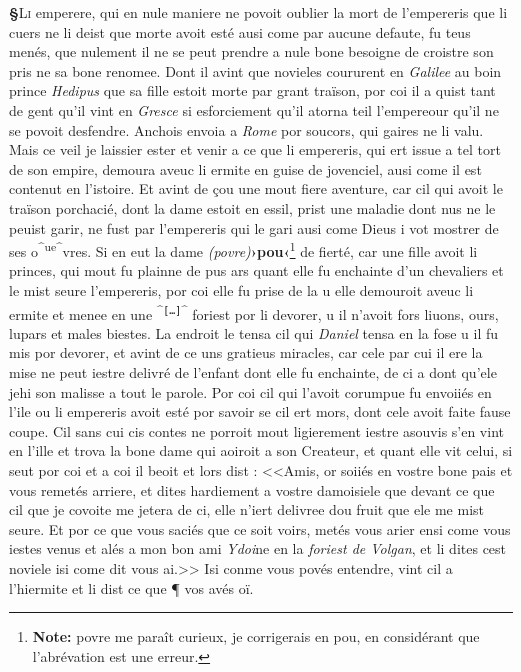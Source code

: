 \documentclass[12pt]{article} %
\newcommand{\colmar}[1]{\marginnote{[#1]}}          %
\newcommand{\persName}[1]{\emph{#1}} %
\newcommand{\placeName}[1]{\emph{#1}} %
\newcommand{\corr}[2]{\emph{(#1)}\textbf{›#2‹}} %
\newcommand{\add}[1]{\textsuperscript{#1}}       %
\newcommand{\supplied}[1]{\textlangle#1\textrangle} %
\newcommand{\missing}{\texttt{[\ldots]}}     %
\newcommand{\fnnote}[1]{\footnote{\textbf{Note:} #1}} %
\newcounter{paranum}
\newcommand{\pnum}{\stepcounter{paranum}\textbf{§\arabic{paranum}}\quad}
\begin{document}
\pnum \lettrine[lines=3]{\color{darkblue}L}{i} emperere, qui en nule maniere ne povoit oublier la mort de l'empereris que li cuers ne li deist que morte avoit esté ausi come par aucune defaute, fu teus menés, que nulement il ne se peut prendre a nule bone besoigne de croistre son pris ne sa bone renomee. Dont il avint que novieles coururent en \placeName{Galilee} au boin prince \persName{Hedipus} que sa fille estoit morte par grant traïson, por coi il a quist tant de gent qu'il vint en \placeName{Gresce} si esforciement qu'il atorna teil l'empereour qu'il ne se povoit desfendre. Anchois envoia a \placeName{Rome} por soucors, qui gaires ne li valu. Mais ce veil je laissier ester et venir a ce que li empereris, qui ert issue a tel tort de son empire, demoura aveuc li ermite en guise de jovenciel, ausi come il est contenut en l'istoire. Et av\supplied{i}nt de çou une mout fiere aventure, car cil qui avoit le traïson porchacié, dont la dame estoit en essil, prist une maladie dont nus ne le peuist garir, ne fust par l'empereris qui le gari ausi come Dieus i vot mostrer de ses o\add{^ue^}vres. Si en eut la dame \corr{povre}{pou}\fnnote{povre me paraît curieux, je corrigerais en pou, en considérant que l'abrévation est une erreur.} de fierté, car une fille avoit li princes, qui mout fu plainne de pus ars quant elle fu enchainte d'un chevaliers et le mist seure l'empereris, por coi elle fu prise de la u elle demouroit aveuc li ermite et menee en une \add{^\missing{}^} foriest por li devorer, u il n'avoit fors liuons, ours, lupars et males biestes. La endroit le tensa cil qui \persName{Daniel} tensa en la fose u il fu mis por devorer, et avint de ce uns gratieus miracles, car cele par cui il ere la mise ne peut iestre delivré de l'enfant dont elle fu enchainte, de ci a dont qu'ele jehi son malisse a tout le parole. Por coi cil qui l'avoit corumpue fu envoiiés en l'ile ou li empereris avoit esté por savoir se cil ert mors, dont cele avoit faite fause coupe. Cil sans cui cis contes ne porroit mout ligierement iestre asouvis s'en vint en l'ille et trova la bone dame qui aoiroit a son Createur, et quant elle vit celui, si seut por coi et a coi il beoit et lors dist : <<Amis, or soiiés en vostre bone pais et vous remetés arriere, et dites hardiement a vostre damoisiele que devant ce que cil que je covoite me jetera de ci, elle n'iert delivree dou fruit que ele me mist seure. Et por ce que vous saciés que ce soit voirs, metés vous arier ensi come vous iestes venus et alés a mon bon ami \persName{Ydoi}\colmar{1vb}\colmar{b}ne en la \placeName{foriest de Volgan}, et li dites cest noviele isi come dit vous ai.>> Isi conme vous povés entendre, vint cil a l'hiermite et li dist ce que ¶ vos avés oï.
\end{document}
